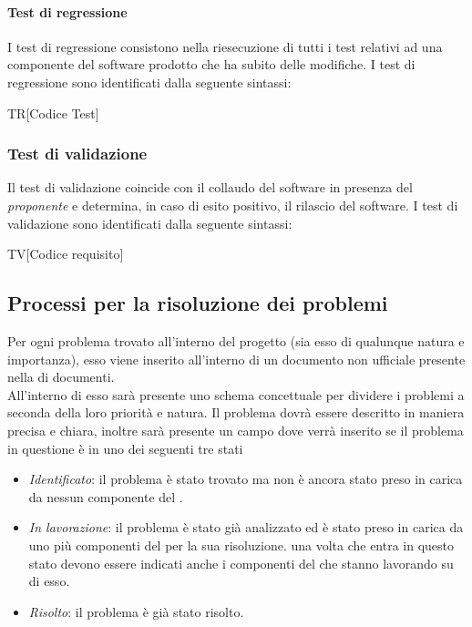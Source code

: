 \paragraph{Test di regressione}
I test di regressione consistono nella riesecuzione di tutti i test relativi ad una
componente del software prodotto che ha subito delle modifiche. I test di regressione sono identificati dalla seguente sintassi:
\begin{center}
  TR[Codice Test]
\end{center}




\subsubsection{Test di validazione}
Il test di validazione coincide con il collaudo del software in presenza del \textit{proponente} e determina, in caso di esito positivo, il rilascio del software. I test di validazione sono identificati dalla seguente sintassi:
\begin{center}
  TV[Codice requisito]
\end{center}

\subsection{Processi per la risoluzione dei problemi}
Per ogni problema trovato all'interno del progetto (sia esso di qualunque natura e importanza), esso viene inserito all'interno di un documento non ufficiale presente nella  di documenti. \\
All'interno di esso sarà presente uno schema concettuale per dividere i problemi a seconda della loro priorità e natura. Il problema dovrà essere descritto in maniera precisa e chiara, inoltre sarà presente un campo dove verrà inserito se il problema in questione è in uno dei seguenti tre stati
\begin{itemize}
	\item \textit{Identificato}: il problema è stato trovato ma non è ancora stato preso in carica da nessun componente del .
	\item\textit{In lavorazione}: il problema è stato già analizzato ed è stato preso in carica da uno più componenti del  per la sua risoluzione. una volta che entra in questo stato devono essere indicati anche i componenti del  che stanno lavorando su di esso.
	\item \textit{Risolto}: il problema è già stato risolto.
\end{itemize}

\newpage